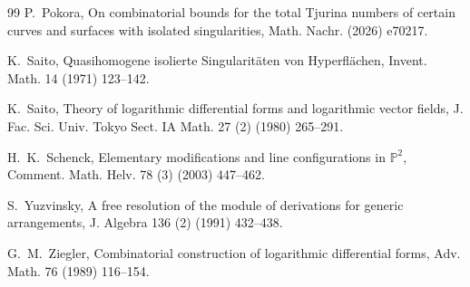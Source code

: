 \documentclass[11pt]{amsart}   %
\theoremstyle{definition}
\def\NZQ{\mathbb}               %
\def\PP{{\NZQ P}}
\begin{document}
\begin{thebibliography}{99}
P.~Pokora,
On combinatorial bounds for the total Tjurina numbers of certain
curves and surfaces with isolated singularities,
Math. Nachr. (2026) e70217.


K.~Saito,
Quasihomogene isolierte Singularit\"aten von Hyperfl\"achen,
Invent. Math. 14 (1971) 123--142.

K.~Saito,
Theory of logarithmic differential forms and logarithmic vector fields,
J. Fac. Sci. Univ. Tokyo Sect. IA Math. 27 (2) (1980) 265--291.

H.~K.~Schenck,
Elementary modifications and line configurations in $\PP^2$,
Comment. Math. Helv. 78 (3) (2003) 447--462.

S.~Yuzvinsky,
A free resolution of the module of derivations for generic arrangements,
J. Algebra 136 (2) (1991) 432--438.

G.~M.~Ziegler,
Combinatorial construction of logarithmic differential forms,
Adv. Math. 76 (1989) 116--154.

\end{thebibliography}
\end{document}
